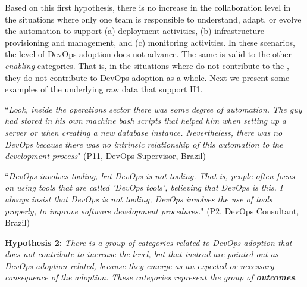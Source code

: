 Based on this first hypothesis, there is no increase in the collaboration
level in the situations where only one team is responsible to understand, adapt, or
evolve the automation to support (a) deployment activities, (b) infrastructure provisioning and management,
and (c) monitoring activities. In these scenarios, the level of DevOps adoption does not advance.
The same is valid to the other \emph{enabling} categories. That is, in the situations where
 do not contribute to
the \cc, they do not contribute to DevOps adoption as a whole. Next
we present some examples of the underlying raw data that support H1.

\begin{mq}
``\emph{Look, inside the operations sector there was some degree of automation. The guy
had stored in his own machine bash scripts that helped him when setting up a
server or when creating a new database instance. Nevertheless, there was no DevOps
because there was no intrinsic relationship of this automation to the
development process}" (P11, DevOps Supervisor, Brazil)
\end{mq}


\begin{mq}
``\emph{DevOps involves tooling, but DevOps is not tooling. That is, people often
focus on using tools that are called 'DevOps tools', believing that DevOps is
this. I always insist that DevOps is not tooling, DevOps involves the use of 
tools properly, to improve software development procedures.}" (P2, DevOps
Consultant, Brazil)
\end{mq}



\begin{mh}
\textbf{Hypothesis 2:} \textit{There is a group of categories related to DevOps adoption
that does not contribute to increase the} \cc \emph{level, but that instead are
pointed out as DevOps adoption related, because they emerge as an expected or
necessary consequence of the adoption. These categories represent the group of 
\textbf{outcomes}}.
\end{mh}

